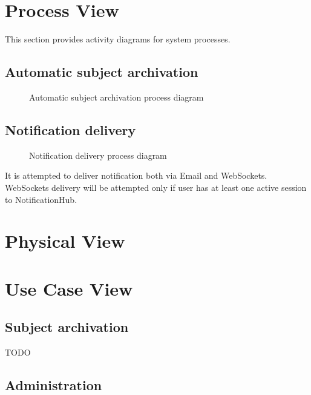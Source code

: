 \documentclass[
    english, %
]{VUMIFPSkursinis}
\begin{document}
\section{Process View}

This section provides activity diagrams for system processes.

\subsection{Automatic subject archivation}

\begin{figure}[ht]
    \centering
    
    \caption{Automatic subject archivation process diagram}
    \label{automatic-archivation-process}
\end{figure}

\subsection{Notification delivery}

\begin{figure}[ht]
    \centering
    
    \caption{Notification delivery process diagram}
    \label{notification-process}
\end{figure}

It is attempted to deliver notification both via Email and WebSockets. WebSockets delivery will be attempted only if user has at least one active session to NotificationHub.

\section{Physical View}

\section{Use Case View}

\subsection{Subject archivation}

TODO

\subsection{Administration}
\end{document}
